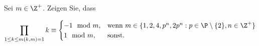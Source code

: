 
\begin{exercise}

Sei $m \in \Z^+$. Zeigen Sie, dass

\begin{align*}
    \prod_{\substack{1 \leq k \leq m}{(k,m) = 1}} k
    \equiv \begin{cases}
        -1 \mod{m}, & \text{wenn } m \in \{1,2,4,p^n,2p^n: p \in \P\setminus\{2\}, n \in \Z^+\} \\
        1 \mod{m}, & \text{sonst.}
    \end{cases}
\end{align*}

\end{exercise}


\begin{solution}

\phantom{}

\end{solution}

